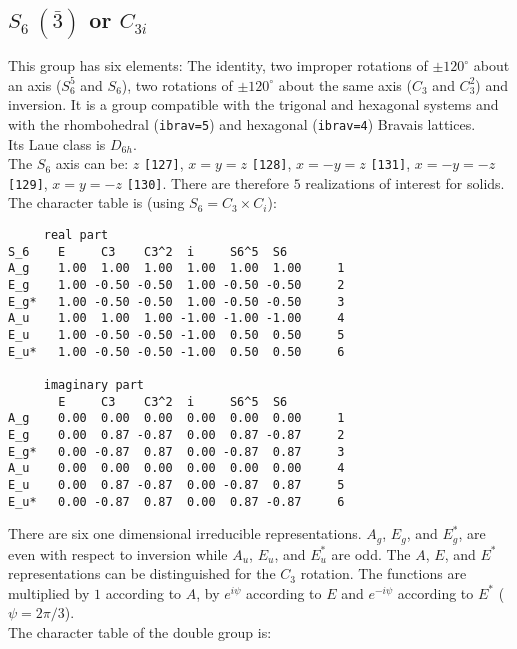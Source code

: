 \documentclass[12pt,a4paper]{article}
\begin{document}
\subsection{\color{web-blue}$S_6\ (\bar 3)$ or $C_{3i}$}  
This group has six elements: The identity, two improper rotations 
of $\pm120^\circ$ about an axis ($S_6^5$ and $S_6$), two rotations of 
$\pm120^\circ$ about the same axis ($C_3$ and $C_3^2$) and inversion.
It is a group compatible with the trigonal and hexagonal systems and with the  
rhombohedral (\texttt{ibrav=5}) and hexagonal (\texttt{ibrav=4}) Bravais lattices. \\
Its Laue class is $D_{6h}$. \\
The $S_6$ axis can be: $z$ \texttt{[127]}, $x=y=z$ \texttt{[128]}, 
$x=-y=z$ \texttt{[131]}, $x=-y=-z$ \texttt{[129]}, $x=y=-z$ \texttt{[130]}.
There are therefore $5$ realizations of interest for solids. \\
The character table is (using $S_6=C_3 \times C_i$):
\begin{verbatim}
     real part
S_6    E     C3    C3^2  i     S6^5  S6   
A_g    1.00  1.00  1.00  1.00  1.00  1.00     1
E_g    1.00 -0.50 -0.50  1.00 -0.50 -0.50     2
E_g*   1.00 -0.50 -0.50  1.00 -0.50 -0.50     3
A_u    1.00  1.00  1.00 -1.00 -1.00 -1.00     4
E_u    1.00 -0.50 -0.50 -1.00  0.50  0.50     5
E_u*   1.00 -0.50 -0.50 -1.00  0.50  0.50     6

     imaginary part
       E     C3    C3^2  i     S6^5  S6   
A_g    0.00  0.00  0.00  0.00  0.00  0.00     1
E_g    0.00  0.87 -0.87  0.00  0.87 -0.87     2
E_g*   0.00 -0.87  0.87  0.00 -0.87  0.87     3
A_u    0.00  0.00  0.00  0.00  0.00  0.00     4
E_u    0.00  0.87 -0.87  0.00 -0.87  0.87     5
E_u*   0.00 -0.87  0.87  0.00  0.87 -0.87     6
\end{verbatim}
There are six one dimensional irreducible representations. $A_g$, $E_g$,
and $E_g^*$, are even with respect to inversion while $A_u$, $E_u$, and $E_u^*$
are odd. The $A$, $E$, and $E^*$ representations can be distinguished 
for the $C_3$ rotation. The functions are multiplied by $1$ according to $A$,
by $e^{i\psi}$ according to $E$ and $e^{-i\psi}$ according to $E^*$
($\psi=2\pi/3$). \\
The character table of the double group is:
\end{document}
